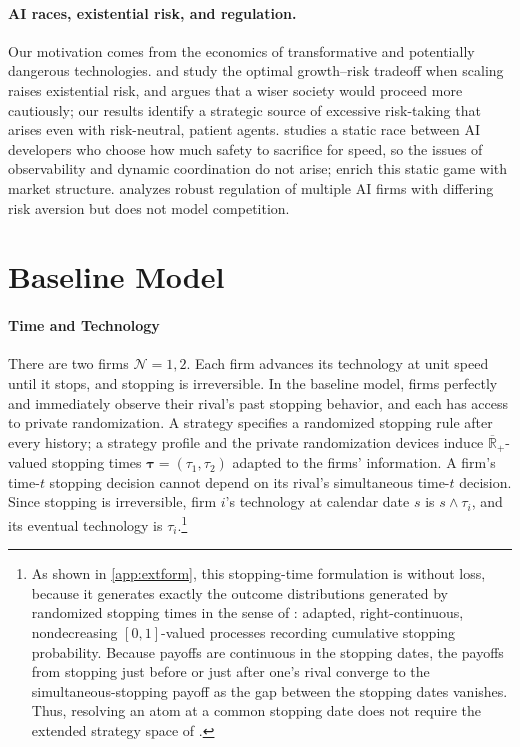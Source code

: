 \documentclass[12pt,reqno]{article}
\theoremstyle{definition} \newtheorem{example}{Example}
\theoremstyle{definition} \newtheorem{condition}{Condition}
\theoremstyle{definition} \newtheorem{corollary}{Corollary}
\theoremstyle{definition} \newtheorem{claim}{Claim}
\theoremstyle{definition} \newtheorem{definition}{Definition}
\theoremstyle{definition} \newtheorem{conjecture}{Conjecture}
\theoremstyle{definition} \newtheorem{Lemma}{Lemma}
\theoremstyle{definition} \newtheorem{lemma}{Lemma}
\theoremstyle{plain} \newtheorem{theorem}{Theorem}
\theoremstyle{definition} \newtheorem{assumption}{Assumption}
\theoremstyle{definition} \newtheorem*{assumptionnonumber}{Assumption}
\theoremstyle{definition} \newtheorem*{theoremNoNumber}{Proposition}
\theoremstyle{definition}
\theoremstyle{definition}\newtheorem{proposition}{Proposition}
\theoremstyle{definition} \newtheorem{result}{Result}
\theoremstyle{definition} \newtheorem*{definitionNoNumber}{Definition}
\theoremstyle{definition} \newtheorem{Definition}{Definition}
\theoremstyle{definition} \newtheorem*{DefinitionNoNumber}{Definition}
\theoremstyle{definition} \newtheorem*{fact}{Fact}
\theoremstyle{definition} \newtheorem*{property}{Property}
\theoremstyle{definition} \newtheorem{remark}{Remark}
\begin{document}
\paragraph{AI races, existential risk, and regulation.}
Our motivation comes from the economics of transformative and potentially
dangerous technologies. \citet{jones2024ai} and \citet{trammell2024existential}
study the optimal growth--risk tradeoff when scaling raises existential risk,
and \citet{ord2020precipice} argues that a wiser society would proceed more
cautiously; our results identify a strategic source of excessive
risk-taking that arises even with risk-neutral, patient agents.
\citet{armstrong2016racing} studies a static race between AI developers who choose how much safety to sacrifice for speed, so the issues of observability and dynamic coordination do not arise;  \citet{buenodemesquita2026agi} enrich this static game with market structure. \citet{koh2024robust} analyzes robust regulation of multiple AI firms with differing risk aversion but does not model competition.

\section{Baseline Model}
\paragraph{Time and Technology} There are two firms $\mathcal N={1,2}$. Each firm advances its technology at unit speed until it stops, and stopping is irreversible. In the baseline model, firms perfectly and immediately observe their rival’s past stopping behavior, and each has access to private randomization. A strategy specifies a randomized stopping rule after every history; a strategy profile and the private randomization devices induce $\overline{\mathbb R}_+$-valued stopping times $\bm\tau=(\tau_1,\tau_2)$ adapted to the firms’ information. A firm’s time-$t$ stopping decision cannot depend on its rival’s simultaneous time-$t$ decision. Since stopping is irreversible, firm $i$’s technology at calendar date $s$ is $s\wedge\tau_i$, and its eventual technology is $\tau_i$.\footnote{As shown in \cref{app:extform}, this stopping-time formulation  is without loss, because it generates exactly the outcome distributions generated by randomized stopping times in the sense of \citet{touzi2002dynkin}: adapted, right-continuous, nondecreasing $[0,1]$-valued processes recording cumulative stopping probability. Because payoffs are continuous in the stopping dates, the payoffs from stopping just before or just after one’s rival converge to the simultaneous-stopping payoff as the gap between the stopping dates vanishes. Thus, resolving an atom at a common stopping date does not require the extended strategy space of \citet{fudenberg1985preemption}.}
\end{document}
